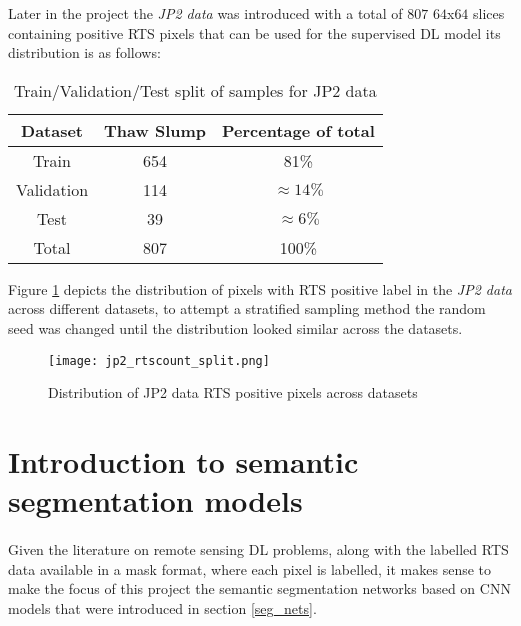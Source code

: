 Later in the project the \textit{\gls{JP2} data} was introduced with a total of $807$ $64$x$64$ slices containing positive \gls{RTS} pixels that can be used for the supervised \gls{DL} model its distribution is as follows:
\begin{table}[ht!] 
    \begin{center}
    \begin{tabular}{c|c|c}     
    \textbf{Dataset} & \textbf{Thaw Slump} & \textbf{Percentage of total} \\
    \hline
    Train 
    & 654 & 81\% \\
    \hline
    Validation 
    &  114 & $\approx 14\%$  \\
    \hline
    Test 
    &  39 & $\approx 6\%$ \\
    \hline
    Total 
    &  807 & 100\% \\
    \hline
    \end{tabular}
    \end{center}
    \caption{Train/Validation/Test split of samples for \gls{JP2} data} \label{table_label_data_jp2}
\end{table}

Figure \ref{jp2_rts_pixel_dist} depicts the distribution of pixels with \gls{RTS} positive label in the \textit{\gls{JP2} data} across different datasets, to attempt a stratified sampling method the random seed was changed until the distribution looked similar across the datasets.
    \begin{figure}[hbt!]
        \centering
        \texttt{[image: jp2\_rtscount\_split.png]}
        \caption{Distribution of \gls{JP2} data \gls{RTS} positive pixels across datasets}
        \label{jp2_rts_pixel_dist}
    \end{figure}
\section{Introduction to semantic segmentation models}
\paragraph{}
Given the literature on remote sensing \gls{DL} problems, along with the labelled \gls{RTS} data available in a mask format, where each pixel is labelled, it makes sense to make the focus of this project the semantic segmentation networks based on CNN models that were introduced in section \ref{seg_nets}.

